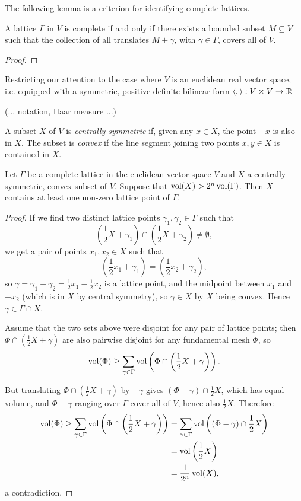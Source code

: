 The following lemma is a criterion for identifying complete lattices.

\begin{lemma}
	A lattice $\Gamma$ in $V$ is complete if and only if there exists a bounded subset $M\subseteq V$ such that the collection of all translates $M+\gamma$, with $\gamma\in\Gamma$, covers all of $V$.
\end{lemma}
\begin{proof}
\end{proof}


Restricting our attention to the case where $V$ is an euclidean real vector space, i.e. equipped with a symmetric, positive definite bilinear form $\langle,\rangle:V\times V\to\mathbb{R}$

(... notation, Haar measure ...)

A subset $X$ of $V$ is \emph{centrally symmetric} if, given any $x\in X$, the point $-x$ is also in $X$. The subset is \emph{convex} if the line segment joining two points $x,y\in X$ is contained in $X$.

\begin{theorem}
	Let $\Gamma$ be a complete lattice in the euclidean vector space $V$ and $X$ a centrally symmetric, convex subset of $V$. Suppose that $\operatorname{vol}(X) > 2^n\operatorname{vol}(\Gamma)$. Then $X$ contains at least one non-zero lattice point of $\Gamma$.
\end{theorem}
\begin{proof}
	If we find two distinct lattice points $\gamma_1,\gamma_2\in\Gamma$ such that
	\[
		\left(\frac{1}{2}X + \gamma_1\right)\cap\left(\frac{1}{2}X + \gamma_2\right) \neq \emptyset,
	\]
	we get a pair of points $x_1,x_2\in X$ such that
	\[
		\left(\frac{1}{2}x_1 + \gamma_1\right) = \left(\frac{1}{2}x_2 + \gamma_2\right),
	\]
	so $\gamma=\gamma_1-\gamma_2=\frac{1}{2}x_1-\frac{1}{2}x_2$ is a lattice point, and the midpoint between $x_1$ and $-x_2$ (which is in $X$ by central symmetry), so $\gamma\in X$ by $X$ being convex. Hence $\gamma\in\Gamma\cap X$.


	Assume that the two sets above were disjoint for any pair of lattice points; then $\Phi\cap\left(\frac{1}{2}X+\gamma\right)$ are also pairwise disjoint for any fundamental mesh $\Phi$, so 
	\[
		\operatorname{vol}(\Phi) \geq \sum_{\gamma\in\Gamma} \operatorname{vol}\left(\Phi\cap\left(\frac{1}{2}X+\gamma\right)\right).
	\]

	But translating $\Phi\cap\left(\frac{1}{2}X+\gamma\right)$ by $-\gamma$ gives $(\Phi-\gamma)\cap\frac{1}{2}X$, which has equal volume, and $\Phi-\gamma$ ranging over $\Gamma$ cover all of $V$, hence also $\frac{1}{2}X$. Therefore
	\begin{align*}
		\operatorname{vol}(\Phi) \geq \sum_{\gamma\in\Gamma} \operatorname{vol}\left(\Phi\cap\left(\frac{1}{2}X+\gamma\right)\right) &= \sum_{\gamma\in\Gamma}\operatorname{vol}\left((\Phi-\gamma)\cap\frac{1}{2}X\right)\\
			&= \operatorname{vol}\left(\frac{1}{2}X\right)\\
			&= \frac{1}{2^n}\operatorname{vol}(X),
	\end{align*}
	a contradiction.
\end{proof}


